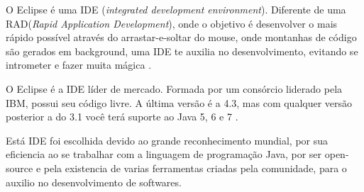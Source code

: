 
O Eclipse é uma IDE (\textit{integrated development environment}). Diferente de uma RAD(\textit{Rapid Application Development}), onde o objetivo é desenvolver o mais rápido possível através do arrastar-e-soltar do mouse, onde montanhas de código são gerados em background, uma IDE te auxilia no desenvolvimento, evitando se intrometer e fazer muita mágica \cite{caelum}.\par

O Eclipse é a IDE líder de mercado. Formada por um consórcio liderado pela IBM, possui seu código livre. A última versão é a 4.3, mas com qualquer versão posterior a do 3.1 você terá suporte ao Java 5, 6 e 7 \cite{caelum}.\par

Está IDE foi escolhida devido ao grande reconhecimento mundial, por sua eficiencia ao se trabalhar com a linguagem de programação Java, por ser open-source e pela existencia de varias ferramentas criadas pela comunidade, para o auxilio no desenvolvimento de softwares.\par